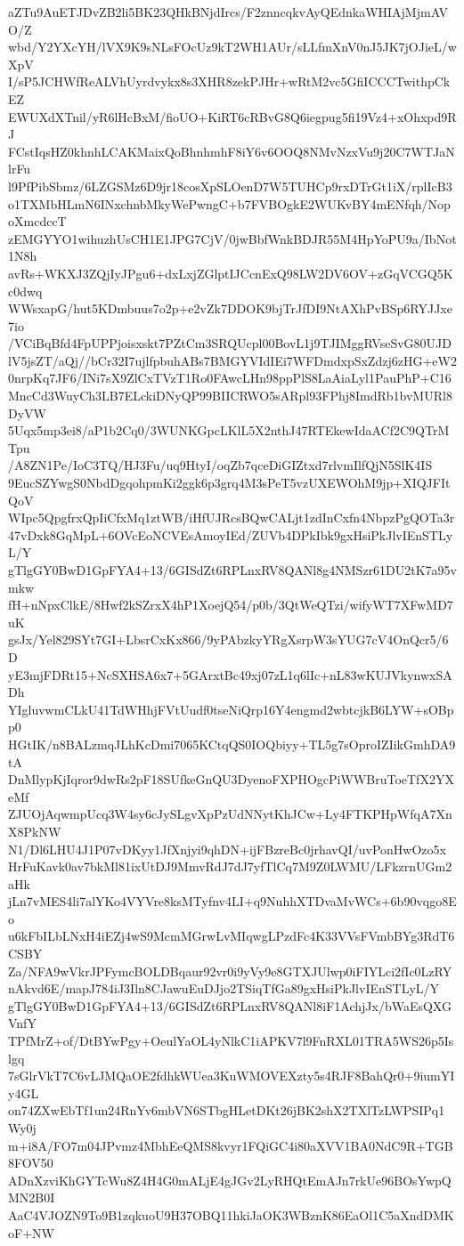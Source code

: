 aZTu9AuETJDvZB2li5BK23QHkBNjdIrcs/F2znncqkvAyQEdnkaWHIAjMjmAVO/Z
wbd/Y2YXcYH/lVX9K9sNLsFOcUz9kT2WH1AUr/sLLfmXnV0nJ5JK7jOJieL/wXpV
I/sP5JCHWfReALVhUyrdvykx8s3XHR8zekPJHr+wRtM2vc5GfiICCCTwithpCkEZ
EWUXdXTnil/yR6lHcBxM/fioUO+KiRT6cRBvG8Q6iegpug5fi19Vz4+xOhxpd9RJ
FCstIqsHZ0khnhLCAKMaixQoBhnhmhF8iY6v6OOQ8NMvNzxVu9j20C7WTJaNlrFu
l9PfPibSbmz/6LZGSMz6D9jr18cosXpSLOenD7W5TUHCp9rxDTrGt1iX/rplIcB3
o1TXMbHLmN6INxchnbMkyWePwngC+b7FVBOgkE2WUKvBY4mENfqh/NopoXmcdccT
zEMGYYO1wihuzhUsCH1E1JPG7CjV/0jwBbfWnkBDJR55M4HpYoPU9a/IbNot1N8h
avRs+WKXJ3ZQjIyJPgu6+dxLxjZGlptIJCcnExQ98LW2DV6OV+zGqVCGQ5Kc0dwq
WWsxapG/hut5KDmbuus7o2p+e2vZk7DDOK9bjTrJfDI9NtAXhPvBSp6RYJJxe7io
/VCiBqBfd4FpUPPjoisxskt7PZtCm3SRQUcpl00BovL1j9TJIMggRVseSvG80UJD
lV5jsZT/aQj//bCr32I7ujlfpbuhABs7BMGYVIdIEi7WFDmdxpSxZdzj6zHG+eW2
0nrpKq7JF6/INi7sX9ZlCxTVzT1Ro0FAwcLHn98ppPlS8LaAiaLyl1PauPhP+C16
MncCd3WuyCh3LB7ELckiDNyQP99BIICRWO5sARpl93FPhj8ImdRb1bvMURl8DyVW
5Uqx5mp3ei8/aP1b2Cq0/3WUNKGpcLKlL5X2nthJ47RTEkewIdaACf2C9QTrMTpu
/A8ZN1Pe/IoC3TQ/HJ3Fu/uq9HtyI/oqZb7qceDiGIZtxd7rlvmIlfQjN5SlK4IS
9EucSZYwgS0NbdDgqohpmKi2ggk6p3grq4M3sPeT5vzUXEWOhM9jp+XIQJFItQoV
WIpc5QpgfrxQpIiCfxMq1ztWB/iHfUJRcsBQwCALjt1zdInCxfn4NbpzPgQOTa3r
47vDxk8GqMpL+6OVcEoNCVEsAmoyIEd/ZUVb4DPkIbk9gxHsiPkJlvIEnSTLyL/Y
gTlgGY0BwD1GpFYA4+13/6GISdZt6RPLnxRV8QANl8g4NMSzr61DU2tK7a95vmkw
fH+nNpxClkE/8Hwf2kSZrxX4hP1XoejQ54/p0b/3QtWeQTzi/wifyWT7XFwMD7uK
gsJx/Yel829SYt7GI+LbsrCxKx866/9yPAbzkyYRgXsrpW3sYUG7cV4OnQcr5/6D
yE3mjFDRt15+NcSXHSA6x7+5GArxtBc49xj07zL1q6lIc+nL83wKUJVkynwxSADh
YIgluvwmCLkU41TdWHhjFVtUudf0tseNiQrp16Y4engmd2wbtcjkB6LYW+sOBpp0
HGtIK/n8BALzmqJLhKcDmi7065KCtqQS0IOQbiyy+TL5g7sOproIZIikGmhDA9tA
DnMlypKjIqror9dwRs2pF18SUfkeGnQU3DyenoFXPHOgcPiWWBruToeTfX2YXeMf
ZJUOjAqwmpUcq3W4sy6cJySLgvXpPzUdNNytKhJCw+Ly4FTKPHpWfqA7XnX8PkNW
N1/Dl6LHU4J1P07vDKyy1JfXnjyi9qhDN+ijFBzreBc0jrhavQI/uvPonHwOzo5x
HrFuKavk0av7bkMl81ixUtDJ9MmvRdJ7dJ7yfTlCq7M9Z0LWMU/LFkzrnUGm2aHk
jLn7vMES4li7alYKo4VYVre8ksMTyfnv4LI+q9NuhhXTDvaMvWCs+6b90vqgo8Eo
u6kFbILbLNxH4iEZj4wS9McmMGrwLvMIqwgLPzdFc4K33VVsFVmbBYg3RdT6CSBY
Za/NFA9wVkrJPFymcBOLDBqaur92vr0i9yVy9e8GTXJUlwp0iFIYLci2fIc0LzRY
nAkvd6E/mapJ784iJ3Iln8CJawuEuDJjo2TSiqTfGa89gxHsiPkJlvIEnSTLyL/Y
gTlgGY0BwD1GpFYA4+13/6GISdZt6RPLnxRV8QANl8iF1AchjJx/bWaEsQXGVnfY
TPfMrZ+of/DtBYwPgy+OeulYaOL4yNlkC1iAPKV7l9FnRXL01TRA5WS26p5Islgq
7sGlrVkT7C6vLJMQaOE2fdhkWUea3KuWMOVEXzty5s4RJF8BahQr0+9iumYIy4GL
on74ZXwEbTf1un24RnYv6mbVN6STbgHLetDKt26jBK2shX2TXlTzLWPSIPq1Wy0j
m+i8A/FO7m04JPvmz4MbhEeQMS8kvyr1FQiGC4i80aXVV1BA0NdC9R+TGB8FOV50
ADnXzviKhGYTcWu8Z4H4G0mALjE4gJGv2LyRHQtEmAJn7rkUe96BOsYwpQMN2B0I
AaC4VJOZN9To9B1zqkuoU9H37OBQ11hkiJaOK3WBznK86EaOl1C5aXndDMKoF+NW
